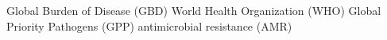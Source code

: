 Global Burden of Disease (GBD)
World Health Organization (WHO)
Global Priority Pathogens (GPP)
antimicrobial resistance (AMR)